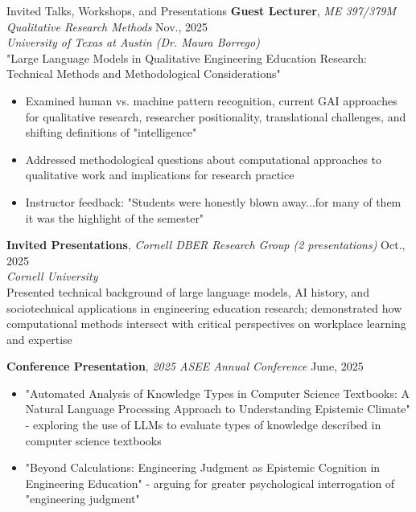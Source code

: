 \documentclass{resume}
\begin{document}
\begin{rSection}{Invited Talks, Workshops, and Presentations}
{\bf Guest Lecturer}{, \emph{ME 397/379M Qualitative Research Methods}} {\hfill Nov., 2025} \\
\emph{University of Texas at Austin (Dr. Maura Borrego)}\\
"Large Language Models in Qualitative Engineering Education Research: Technical Methods and Methodological Considerations"
\begin{itemize}
    \item \vspace{-0.5em} \hspace{-1em} Examined human vs. machine pattern recognition, current GAI approaches for qualitative research, researcher positionality, translational challenges, and shifting definitions of "intelligence"
    \item \vspace{-0.5em} \hspace{-1em} Addressed methodological questions about computational approaches to qualitative work and implications for research practice
    \item \vspace{-0.5em} \hspace{-1em} Instructor feedback: "Students were honestly blown away...for many of them it was the highlight of the semester"
\end{itemize}

{\bf Invited Presentations}{, \emph{Cornell DBER Research Group (2 presentations)}} {\hfill Oct., 2025} \\
\emph{Cornell University}\\
Presented technical background of large language models, AI history, and sociotechnical applications in engineering education research; demonstrated how computational methods intersect with critical perspectives on workplace learning and expertise

{\bf Conference Presentation}{, \emph{2025 ASEE Annual Conference}} {\hfill June, 2025}
\begin{itemize}
    \item \vspace{-0.5em} \hspace{-1em} "Automated Analysis of Knowledge Types in Computer Science Textbooks: A Natural Language Processing Approach to Understanding Epistemic Climate" - exploring the use of LLMs to evaluate types of knowledge described in computer science textbooks
    \item \vspace{-0.5em} \hspace{-1em} "Beyond Calculations: Engineering Judgment as Epistemic Cognition in Engineering Education" - arguing for greater psychological interrogation of "engineering judgment" 
\end{itemize}


\end{rSection}
\end{document}
